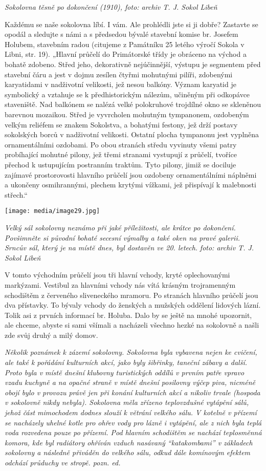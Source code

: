 \emph{Sokolovna těsně po dokončení (1910), foto: archiv T. J. Sokol
Libeň}

Každému se naše sokolovna líbí. I vám. Ale prohlédli jste si ji dobře?
Zastavte se opodál a sledujte s námi a s předsedou bývalé stavební
komise br. Josefem Holubem, stavebním radou (citujeme z Památníku 25
letého výročí Sokola v Libni, str. 19). „Hlavní průčelí do Primátorské
třídy je obráceno na východ a bohatě zdobeno. Střed jeho, dekorativně
nejúčinnější, výstupu je segmentem před stavební čáru a jest v dojmu
zesílen čtyřmi mohutnými pilíři, zdobenými karyatidami v nadživotní
velikosti, jež nesou balkóny. Význam karyatid je symbolický a vztahuje
se k předhistorickým nálezům, učiněným při odkopávce staveniště. Nad
balkónem se nalézá velké polokruhové trojdílné okno se skleněnou
barevnou mozaikou. Střed je vyvrcholen mohutným tympanonem, ozdobeným
velkým reliéfem se znakem Sokolstva, a bohatými festony, jež drží
postavy sokolských borců v nadživotní velikosti. Ostatní plocha
tympanonu jest vyplněna ornamentálními ozdobami. Po obou stranách středu
vyvinuty všemi patry probíhající mohutné pilony, jež třemi stranami
vystupují z průčelí, tvoříce přechod k ustupujícím postranním traktům.
Tyto pilony, jimiž se dociluje zajímavé prostorovosti hlavního průčelí
jsou ozdobeny ornamentálními náplněmi a ukončeny osmihrannými, plechem
krytými vížkami, jež přispívají k malebnosti střech.``

\texttt{[image: media/image29.jpg]}

\emph{Velký sál sokolovny neznámo při jaké příležitosti, ale krátce po
dokončení. Povšimněte si původní bohaté secesní výmalby a také oken na
pravé galerii. Srncův sál, který je na místě dnes, byl dostavěn ve 20.
letech.} \emph{foto: archiv T. J. Sokol Libeň}

V tomto východním průčelí jsou tři hlavní vchody, kryté oplechovanými
markýzami. Vestibul za hlavními vchody nás vítá krásným trojramenným
schodištěm z červeného sliveneckého mramoru. Po stranách hlavního
průčelí jsou dva přístavky. To bývaly vchody do ženských a mužských
oddělení lidových lázní. \textquotesingle Tolik asi z prvních informací
br. Holuba. Dalo by se ještě na mnohé upozornit, ale chceme, abyste si
sami všímali a nacházeli všechno hezké na sokolovně a našli zde svůj
druhý a milý domov.

\emph{Několik poznámek k zázemí sokolovny. Sokolovna byla vybavena nejen
ke cvičení, ale také k pořádání kulturních akcí, jako byly šibřinky,
taneční zábavy a další. Proto byla v místě dnešní klubovny turistických
oddílů v prvním patře vpravo vzadu kuchyně a na opačné straně v místě
dnešní posilovny výčep piva, nicméně obojí bylo v provozu právě jen při
konání kulturních akcí a nikoliv trvale (hospoda v sokolovně nikdy
nebyla). Sokolovna měla zřízeno teplovzdušné vytápění sálů, jehož část
mimochodem dodnes slouží k větrání velkého sálu. V kotelně v přízemí se
nacházely uhelné kotle pro ohřev vody pro lázně i vytápění, ale z nich
byla teplá voda rozvedena pouze po přízemí. Pod hlavním schodištěm se
nachází teplosměnná komora, kde byl radiátory ohříván vzduch nasávaný
``katakombami'' v základech sokolovny a následně přiváděn do velkého
sálu, odkud dále komínovým efektem odchází průduchy ve stropě. pozn.
ed.}

